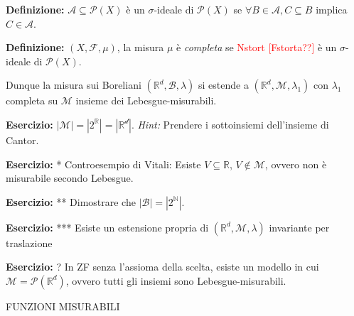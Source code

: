 {\bf Definizione: } \(\mathcal{A}\subseteq \mathscr{P}(X)\) è un $\sigma$-ideale di \(\mathscr{P}(X)\) se $\forall B \in \mathcal{A}, C \subseteq B$ implica $C\in\mathcal{A}$.

{\bf Definizione: } \((X,\mathcal{F},\mu)\), la misura \(\mu\) è {\it completa} se \textcolor{red}{Nstort [Fstorta??]} è un $\sigma$-ideale di $\mathscr{P}(X)$.

Dunque la misura sui Boreliani $(\mathbb{R}^d, \mathcal{B}, \lambda)$ si estende a $(\mathbb{R}^d, \mathcal{M}, \lambda_1)$ con $\lambda_1$ completa su \(\mathcal{M}\) insieme dei Lebesgue-misurabili.

{\bf Esercizio: } $|\mathcal{M}|=|2^{\mathbb{R}}|=|\mathscr{\mathbb{R}^d}|$. {\it Hint:} Prendere i sottoinsiemi dell'insieme di Cantor.

{\bf Esercizio: } * Controesempio di Vitali: Esiste $V\subseteq \mathbb{R}$, $V\not\in \mathcal{M}$, ovvero non è misurabile secondo Lebesgue.

{\bf Esercizio: } ** Dimostrare che $| \mathcal{B} | = | 2^{\mathbb{N}} |$.

{\bf Esercizio: } *** Esiste un estensione propria di $(\mathbb{R}^d, \mathcal{M}, \lambda)$ invariante per traslazione
 
{\bf Esercizio: } ? In ZF senza l'assioma della scelta, esiste un modello in cui $\mathcal{M}=\mathscr{P}(\mathbb{R}^d)$, ovvero tutti gli insiemi sono Lebesgue-misurabili.
\vspace{0.4cm}

{\large\color{red} FUNZIONI MISURABILI}

